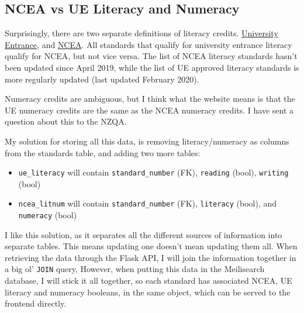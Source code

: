 \documentclass{article}
\begin{document}
\subsection*{NCEA vs UE Literacy and Numeracy}
Surprisingly, there are two separate definitions of literacy credits. \href{https://www.nzqa.govt.nz/qualifications-standards/awards/university-entrance/literacy-requirements/}{University Entrance}, and \href{https://www.nzqa.govt.nz/ncea/subjects/literacy-and-numeracy/level-1-requirements/lit-num-subjects/}{NCEA}. All standards that qualify for university entrance literacy qualify for NCEA, but not vice versa. The list of NCEA literacy standards hasn't been updated since April 2019, while the list of UE approved literacy standards is more regularly updated (last updated February 2020).

Numeracy credits are ambiguous, but I think what the website means is that the UE numeracy credits are the same as the NCEA numeracy credits. I have sent a question about this to the NZQA.

My solution for storing all this data, is removing literacy/numeracy as columns from the standards table, and adding two more tables:
\begin{itemize}
    \item \texttt{ue\_literacy} will contain \texttt{standard\_number} (FK), \texttt{reading} (bool), \texttt{writing} (bool)
    \item \texttt{ncea\_litnum} will contain \texttt{standard\_number} (FK), \texttt{literacy} (bool), and \texttt{numeracy} (bool)
\end{itemize}

I like this solution, as it separates all the different sources of information into separate tables. This means updating one doesn't mean updating them all. When retrieving the data through the Flask API, I will join the information together in a big ol' \texttt{JOIN} query, However, when putting this data in the Meilisearch database, I will stick it all together, so each standard has associated NCEA, UE literacy and numeracy booleans, in the same object, which can be served to the frontend directly.

\end{document}

